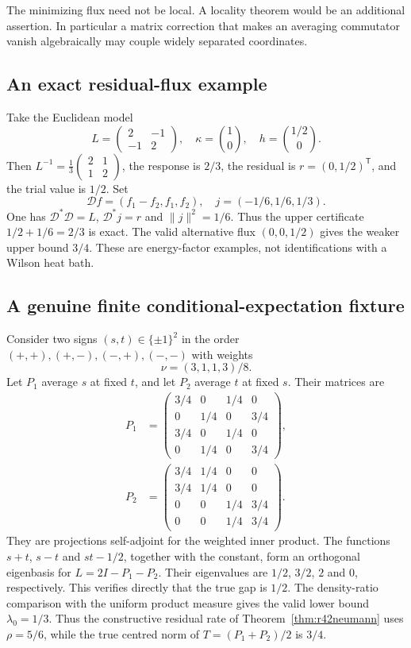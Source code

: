 The minimizing flux need not be local. A locality theorem would be an
additional assertion. In particular a matrix correction that makes an
averaging commutator vanish algebraically may couple widely separated
coordinates.

\subsection{An exact residual-flux example}
Take the Euclidean model
\[
 L=\begin{pmatrix}2&-1\\-1&2\end{pmatrix},\quad
 \kappa=\binom10,\quad h=\binom{1/2}0.
\]
Then $L^{-1}=\frac13\left(\begin{smallmatrix}2&1\\1&2\end{smallmatrix}\right)$,
the response is $2/3$, the residual is $r=(0,1/2)^{\mathsf T}$,
and the trial value is $1/2$. Set
\[
 \mathcal Df=(f_1-f_2,f_1,f_2),\quad
 j=(-1/6,1/6,1/3).
\]
One has $\mathcal D^*\mathcal D=L$,
$\mathcal D^*j=r$ and $\|j\|^2=1/6$. Thus the upper certificate
$1/2+1/6=2/3$ is exact. The valid alternative flux $(0,0,1/2)$
gives the weaker upper bound $3/4$. These are energy-factor examples,
not identifications with a Wilson heat bath.

\subsection{A genuine finite conditional-expectation fixture}
Consider two signs $(s,t)\in\{\pm1\}^2$ in the order
$(+,+),(+,-),(-,+),(-,-)$ with weights
\[
 \nu=(3,1,1,3)/8.
\]
Let $P_1$ average $s$ at fixed $t$, and let $P_2$ average $t$ at
fixed $s$. Their matrices are
\begin{align*}
 P_1&=\begin{pmatrix}
 3/4&0&1/4&0\\0&1/4&0&3/4\\
 3/4&0&1/4&0\\0&1/4&0&3/4
 \end{pmatrix},\\
 P_2&=\begin{pmatrix}
 3/4&1/4&0&0\\3/4&1/4&0&0\\
 0&0&1/4&3/4\\0&0&1/4&3/4
 \end{pmatrix}.
\end{align*}
They are projections self-adjoint for the weighted inner product.
The functions $s+t$, $s-t$ and $st-1/2$, together with the constant,
form an orthogonal eigenbasis for $L=2I-P_1-P_2$. Their eigenvalues
are $1/2$, $3/2$, $2$ and $0$, respectively. This verifies directly
that the true gap is $1/2$. The density-ratio comparison with the
uniform product measure gives the valid lower bound $\lambda_0=1/3$.
Thus the constructive residual rate of Theorem~\ref{thm:r42neumann}
uses $\rho=5/6$, while the true centred norm of
$T=(P_1+P_2)/2$ is $3/4$.

